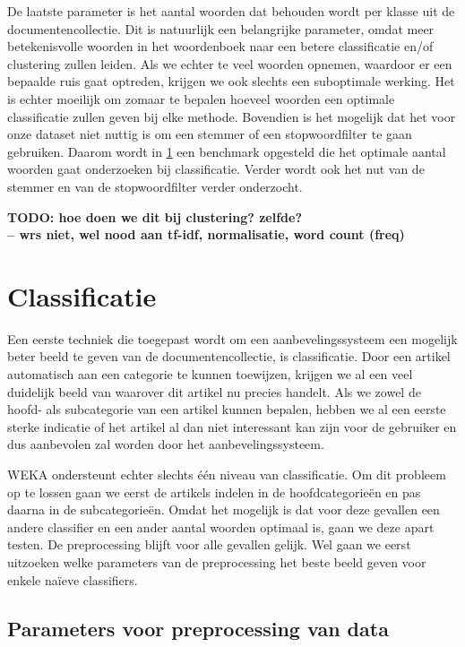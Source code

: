 De laatste parameter is het aantal woorden dat behouden wordt per klasse uit de documentencollectie. Dit is natuurlijk een belangrijke parameter, omdat meer betekenisvolle woorden in het woordenboek naar een betere classificatie en/of clustering zullen leiden. Als we echter te veel woorden opnemen, waardoor er een bepaalde ruis gaat optreden, krijgen we ook slechts een suboptimale werking. Het is echter moeilijk om zomaar te bepalen hoeveel woorden een optimale classificatie zullen geven bij elke methode. Bovendien is het mogelijk dat het voor onze dataset niet nuttig is om een stemmer of een stopwoordfilter te gaan gebruiken. Daarom wordt in \ref{result-clas} een benchmark opgesteld die het optimale aantal woorden gaat onderzoeken bij classificatie. Verder wordt ook het  nut van de stemmer en van de stopwoordfilter verder onderzocht. 

\textbf{TODO: hoe doen we dit bij clustering? zelfde?\\-- wrs niet, wel nood aan tf-idf, normalisatie, word count (freq)}

\section{Classificatie}\label{result-clas}
Een eerste techniek die toegepast wordt om een aanbevelingssysteem een mogelijk beter beeld te geven van de documentencollectie, is classificatie. Door een artikel automatisch aan een categorie te kunnen toewijzen, krijgen we al een veel duidelijk beeld van waarover dit artikel nu precies handelt. Als we zowel de hoofd- als subcategorie van een artikel kunnen bepalen, hebben we al een eerste sterke indicatie of het artikel al dan niet interessant kan zijn voor de gebruiker en dus aanbevolen zal worden door het aanbevelingssysteem. 

WEKA ondersteunt echter slechts \'e\'en niveau van classificatie. Om dit probleem op te lossen gaan we eerst de artikels indelen in de hoofdcategorie\"en en pas daarna in de subcategorie\"en. Omdat het mogelijk is dat voor deze gevallen een andere classifier en een ander aantal woorden optimaal is, gaan we deze apart testen. De preprocessing blijft voor alle gevallen gelijk. Wel gaan we eerst uitzoeken welke parameters van de preprocessing het beste beeld geven voor enkele na\"ieve classifiers. 

\subsection{Parameters voor preprocessing van data}

